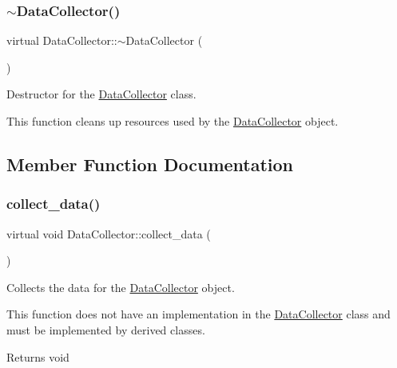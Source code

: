 \subsubsection{\texorpdfstring{$\sim$\+Data\+Collector()}{~DataCollector()}}
{\footnotesize\ttfamily virtual Data\+Collector\+::$\sim$\+Data\+Collector (\begin{DoxyParamCaption}{ }\end{DoxyParamCaption})\hspace{0.3cm}{\ttfamily [virtual]}}



Destructor for the \mbox{\hyperlink{classDataCollector}{Data\+Collector}} class. 

This function cleans up resources used by the \mbox{\hyperlink{classDataCollector}{Data\+Collector}} object. 

\subsection{Member Function Documentation}
\mbox{\label{classDataCollector_a01486bf58acbe37b203f97b3b9a79c40}} 
\subsubsection{\texorpdfstring{collect\+\_\+data()}{collect\_data()}}
{\footnotesize\ttfamily virtual void Data\+Collector\+::collect\+\_\+data (\begin{DoxyParamCaption}{ }\end{DoxyParamCaption})\hspace{0.3cm}{\ttfamily [pure virtual]}}



Collects the data for the \mbox{\hyperlink{classDataCollector}{Data\+Collector}} object. 

This function does not have an implementation in the \mbox{\hyperlink{classDataCollector}{Data\+Collector}} class and must be implemented by derived classes.

\begin{DoxyReturn}{Returns}
void 
\end{DoxyReturn}


